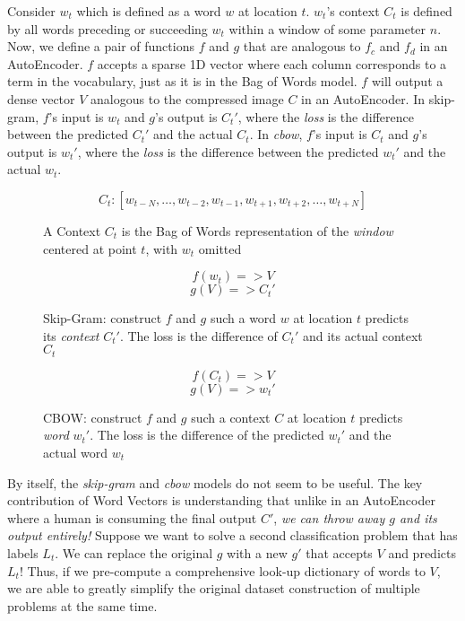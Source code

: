 \par{
Consider $w_t$ which is defined as a word $w$ at location $t$. $w_t$'s context $C_t$ is defined by all words preceding or succeeding $w_t$ within a window of some parameter $n$. Now, we define a pair of functions $f$ and $g$ that are analogous to $f_c$ and $f_d$ in an AutoEncoder. $f$ accepts a sparse 1D vector where each column corresponds to a term in the vocabulary, just as it is in the Bag of Words model. $f$ will output a dense vector $V$ analogous to the compressed image $C$ in an AutoEncoder. In \textsf{skip-gram}, $f$'s input is $w_t$ and $g$'s output is $C_t'$, where the \textit{loss} is the difference between the predicted $C_t'$ and the actual $C_t$. In \textit{cbow}, $f$'s input is $C_t$ and $g$'s output is $w_t'$, where the \textit{loss} is the difference between the predicted $w_t'$ and the actual $w_t$. 
}


\begin{figure}[H]
\[ C_t: [w_{t-N}, \ldots, w_{t-2}, w_{t-1}, w_{t+1}, w_{t+2}, \ldots, w_{t+N}] \]
\caption{A Context $C_t$ is the Bag of Words representation of the \textit{window} centered at point $t$, with $w_t$ omitted}
\end{figure}


\begin{figure}[H]
\[ f(w_t) => V \]
\[ g(V) => C_t' \]
\caption{Skip-Gram: construct $f$ and $g$ such a word $w$ at location $t$ predicts its \textit{context} $C_t'$. The loss is the difference of $C_t'$ and its actual context $C_t$}
\end{figure}

\begin{figure}[H]
\[ f(C_t) => V \]
\[ g(V) => w_t' \]
\caption{CBOW: construct $f$ and $g$ such a context $C$ at location $t$ predicts \textit{word} $w_t'$. The loss is the difference of the predicted $w_t'$ and the actual word $w_t$}
\end{figure}

\par{
By itself, the \textit{skip-gram} and \textit{cbow} models do not seem to be useful. The key contribution of Word Vectors is understanding that unlike in an AutoEncoder where a human is consuming the final output $C'$, \textit{we can throw away $g$ and its output entirely!} Suppose we want to solve a second classification problem that has labels $L_t$. We can replace the original $g$ with a new $g'$ that accepts $V$ and predicts $L_t$! Thus, if we pre-compute a comprehensive look-up dictionary of words to $V$, we are able to greatly simplify the original dataset construction of multiple problems at the same time. 
}

